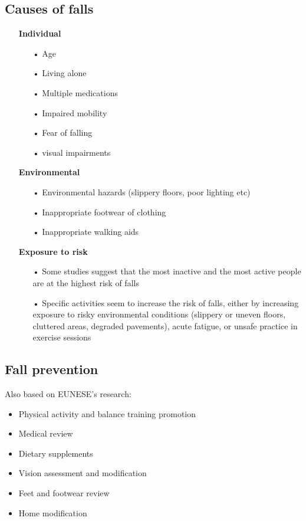 \subsection*{Causes of falls}
\begin{itemize}
    \item[] \textbf{Individual}\cite{facts}
        \begin{itemize}
          \item[•] Age 
          \item[•] Living alone
          \item[•] Multiple medications
          \item[•] Impaired mobility
          \item[•] Fear of falling
          \item[•] visual impairments
        \end{itemize}
    \item[] \textbf{Environmental}\cite{facts}
         \begin{itemize}
          \item[•] Environmental hazards (slippery floors, poor lighting etc)
          \item[•] Inappropriate footwear of clothing
          \item[•] Inappropriate walking aids
        \end{itemize}
    \item[] \textbf{Exposure to risk}\cite{facts}
         \begin{itemize}
          \item[•] Some studies suggest that the most inactive and the most active people are at the highest risk of falls
          \item[•]Specific activities seem to increase the risk of falls, either by increasing exposure to risky environmental conditions (slippery or uneven floors, cluttered areas, degraded pavements), acute fatigue, or unsafe practice in exercise sessions
        \end{itemize}
\end{itemize}

\subsection*{Fall prevention}
Also based on EUNESE's \cite{facts} research:
\begin{itemize}
  \item Physical activity and balance training promotion
  \item Medical review
  \item Dietary supplements
  \item Vision assessment and modification
  \item Feet and footwear review
  \item Home modification
\end{itemize}

